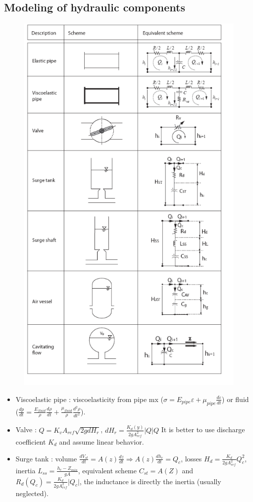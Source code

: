 \documentclass[../main.tex]{subfiles}
\begin{document}
\subsection{Modeling of hydraulic components}

\begin{figure}[hbt!]
    \centering
    \includegraphics[width=0.5\linewidth]{IMAGES/Hydraulic/Screenshot from 2025-04-04 11-52-17.png}
\end{figure}

\begin{itemize}
    \item Viscoelastic pipe : viscoelasticity from pipe mx ($\sigma = E_{pipe} \varepsilon + \mu_{pipe}\frac{d\varepsilon}{dt}$) or fluid ($\frac{dp}{dt} = \frac{E_{fluid}}{\rho} \frac{d\rho}{dt} + \frac{\mu_{fluid}}{\rho} \frac{d^2 \rho}{dt^2}$).
    \item Valve : $Q = K_v A_{ref} \sqrt{2g dH_r}$, $dH_r = \frac{K_d(y)}{2gA_{ref}^2} \lvert Q \rvert Q$ \warning It is better to use discharge coefficient $K_d$ and assume linear behavior.
    \item Surge tank : volume $\frac{dV_{st}}{dt} = A(z) \frac{dz}{dt} \Rightarrow A(z) \frac{d h_c}{dt} = Q_c$, losses $H_d = \frac{K_d}{2gA_{ref}^2} Q_c^2$, inertia $L_{ss} = \frac{h_c-Z_{min}}{gA}$, equivalent scheme $C_{st} = A(Z)$ and $R_d(Q_c) = \frac{K_d}{2gA_{ref}^2} \lvert Q_c \rvert$, the inductance is directly the inertia (usually neglected).
\end{itemize}
\end{document}
